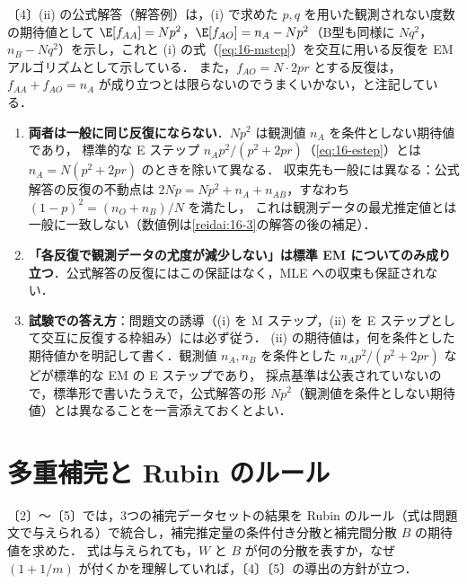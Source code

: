 \begin{warnbox}[試験の公式解答との相違]
〔4〕(ii) の公式解答（解答例）は，(i) で求めた $p,q$ を用いた観測されない度数の期待値として
$\E[f_{AA}]=Np^2$，$\E[f_{AO}]=n_A-Np^2$（B型も同様に $Nq^2$，$n_B-Nq^2$）を示し，これと (i) の式（\cref{eq:16-mstep}）を交互に用いる反復を EM アルゴリズムとして示している．
また，$f_{AO}=N\cdot2pr$ とする反復は，$f_{AA}+f_{AO}=n_A$ が成り立つとは限らないのでうまくいかない，と注記している．
\begin{enumerate}[label=(\arabic*)]
\item \textbf{両者は一般に同じ反復にならない}．$Np^2$ は観測値 $n_A$ を条件としない期待値であり，
      標準的な E ステップ $n_Ap^2/(p^2+2pr)$（\cref{eq:16-estep}）とは $n_A=N(p^2+2pr)$ のときを除いて異なる．
      収束先も一般には異なる：公式解答の反復の不動点は $2Np=Np^2+n_A+n_{AB}$，すなわち $(1-p)^2=(n_O+n_B)/N$ を満たし，
      これは観測データの最尤推定値とは一般に一致しない（数値例は\cref{reidai:16-3}の解答の後の補足）．
\item \textbf{「各反復で観測データの尤度が減少しない」は標準 EM についてのみ成り立つ}．公式解答の反復にはこの保証はなく，MLE への収束も保証されない．
\item \textbf{試験での答え方}：問題文の誘導（(i) を M ステップ，(ii) を E ステップとして交互に反復する枠組み）には必ず従う．
      (ii) の期待値は，何を条件とした期待値かを明記して書く．観測値 $n_A,n_B$ を条件とした $n_Ap^2/(p^2+2pr)$ などが標準的な EM の E ステップであり，
      採点基準は公表されていないので，標準形で書いたうえで，公式解答の形 $Np^2$（観測値を条件としない期待値）とは異なることを一言添えておくとよい．
\end{enumerate}
\end{warnbox}

\section{多重補完と Rubin のルール}\label{sec:16-mi}
\Hinshutsu
{}〔2〕〜〔5〕では，3つの補完データセットの結果を Rubin のルール（式は問題文で与えられる）で統合し，補完推定量の条件付き分散と補完間分散 $B$ の期待値を求めた．
式は与えられても，$W$ と $B$ が何の分散を表すか，なぜ $(1+1/m)$ が付くかを理解していれば，〔4〕〔5〕の導出の方針が立つ．

